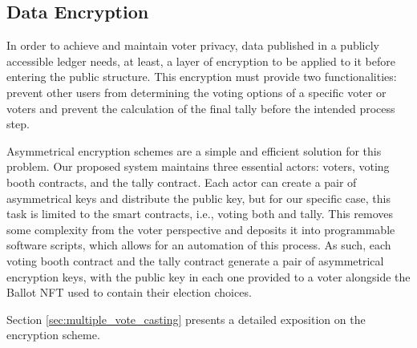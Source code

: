 \documentclass[../main.tex]{subfiles}
\begin{document}
\subsection{Data Encryption}
In order to achieve and maintain voter privacy, data published in a publicly accessible ledger needs, at least, a layer of encryption to be applied to it before entering the public structure. This encryption must provide two functionalities: prevent other users from determining the voting options of a specific voter or voters and prevent the calculation of the final tally before the intended process step.
\par
Asymmetrical encryption schemes are a simple and efficient solution for this problem. Our proposed system maintains three essential actors: voters, voting booth contracts, and the tally contract. Each actor can create a pair of asymmetrical keys and distribute the public key, but for our specific case, this task is limited to the smart contracts, i.e., voting both and tally. This removes some complexity from the voter perspective and deposits it into programmable software scripts, which allows for an automation of this process. As such, each voting booth contract and the tally contract generate a pair of asymmetrical encryption keys, with the public key in each one provided to a voter alongside the Ballot NFT used to contain their election choices.
\par
Section \ref{sec:multiple_vote_casting} presents a detailed exposition on the encryption scheme.
\end{document}
